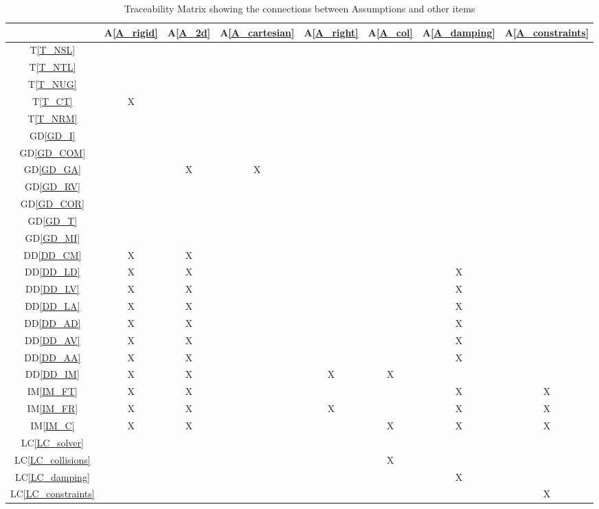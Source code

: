 \documentclass[12pt]{article}
\newcommand{\dref}[1]{GD\ref{#1}}
\newcommand{\ddref}[1]{DD\ref{#1}}
\newcommand{\tref}[1]{T\ref{#1}}
\newcommand{\aref}[1]{A\ref{#1}}
\newcommand{\iref}[1]{IM\ref{#1}}
\newcommand{\lcref}[1]{LC\ref{#1}}
\begin{document}
\begin{table}[h!]
\renewcommand*{\arraystretch}{1.2}
\centering
\begin{tabular}{|c|c|c|c|c|c|c|c|}
\hline 
& \aref{A_rigid} & \aref{A_2d} & \aref{A_cartesian} & \aref{A_right} & \aref{A_col} & \aref{A_damping} & \aref{A_constraints} \\ \hline
\tref{T_NSL} 			& & & & & & & \\ \hline
\tref{T_NTL} 			& & & & & & & \\ \hline
\tref{T_NUG} 			& & & & & & & \\ \hline
\tref{T_CT} 			&X& & & & & & \\ \hline
\tref{T_NRM} 			& & & & & & & \\ \hline
\dref{GD_I} 			& & & & & & & \\ \hline
\dref{GD_COM} 			& & & & & & & \\ \hline
\dref{GD_GA} 			& &X&X& & & & \\ \hline
\dref{GD_RV} 			& & & & & & & \\ \hline
\dref{GD_COR} 			& & & & & & & \\ \hline
\dref{GD_T} 			& & & & & & & \\ \hline
\dref{GD_MI} 			& & & & & & & \\ \hline
\ddref{DD_CM} 			&X&X& & & & & \\ \hline
\ddref{DD_LD} 			&X&X& & & &X& \\ \hline
\ddref{DD_LV} 			&X&X& & & &X& \\ \hline
\ddref{DD_LA} 			&X&X& & & &X& \\ \hline
\ddref{DD_AD} 			&X&X& & & &X& \\ \hline
\ddref{DD_AV} 			&X&X& & & &X& \\ \hline
\ddref{DD_AA} 			&X&X& & & &X& \\ \hline
\ddref{DD_IM} 			&X&X& &X&X& & \\ \hline
\iref{IM_FT} 			&X&X& & & &X&X\\ \hline
\iref{IM_FR} 			&X&X& &X& &X&X\\ \hline
\iref{IM_C} 			&X&X& & &X&X&X\\ \hline
\lcref{LC_solver}		& & & & & & & \\ \hline
\lcref{LC_collisions}	& & & & &X& & \\ \hline
\lcref{LC_damping}		& & & & & &X& \\ \hline
\lcref{LC_constraints}	& & & & & & &X \\ \hline
\end{tabular}
\bigskip
\caption{Traceability Matrix showing the connections between Assumptions and other items} \label{ATraceMatrix}
\end{table}
\end{document}

